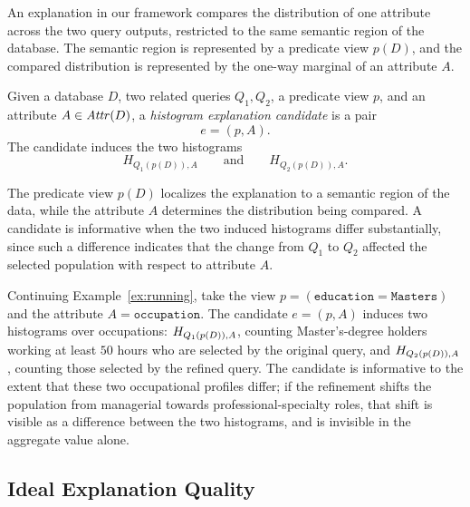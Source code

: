 An explanation in our framework compares the distribution of one attribute across the two query outputs, restricted to the same semantic region of the database.
The semantic region is represented by a predicate view $p(D)$, and the compared distribution is represented by the one-way marginal of an attribute $A$.

\begin{definition}
Given a database $D$, two related queries $Q_1,Q_2$, a predicate view $p$, and an attribute $A \in \mathit{Attr}(D)$, a \emph{histogram explanation candidate} is a pair
\[
    e=(p,A).
\]
The candidate induces the two histograms
\[
    H_{Q_1(p(D)),A}
    \qquad\text{and}\qquad
    H_{Q_2(p(D)),A}.
\]
\end{definition}

The predicate view $p(D)$ localizes the explanation to a semantic region of the data, while the attribute $A$ determines the distribution being compared.
A candidate is informative when the two induced histograms differ substantially, since such a difference indicates that the change from $Q_1$ to $Q_2$ affected the selected population with respect to attribute $A$.

\begin{example}
\label{ex:candidate}
Continuing Example~\ref{ex:running}, take the view $p=(\texttt{education}=\texttt{Masters})$ and the attribute $A=\texttt{occupation}$.
The candidate $e=(p,A)$ induces two histograms over occupations: $H_{Q_1(p(D)),A}$, counting Master's-degree holders working at least $50$ hours who are selected by the original query, and $H_{Q_2(p(D)),A}$, counting those selected by the refined query.
The candidate is informative to the extent that these two occupational profiles differ; if the refinement shifts the population from managerial towards professional-specialty roles, that shift is visible as a difference between the two histograms, and is invisible in the aggregate value alone.
\end{example}

\subsection{Ideal Explanation Quality}
\label{sec:explanation-quality}

